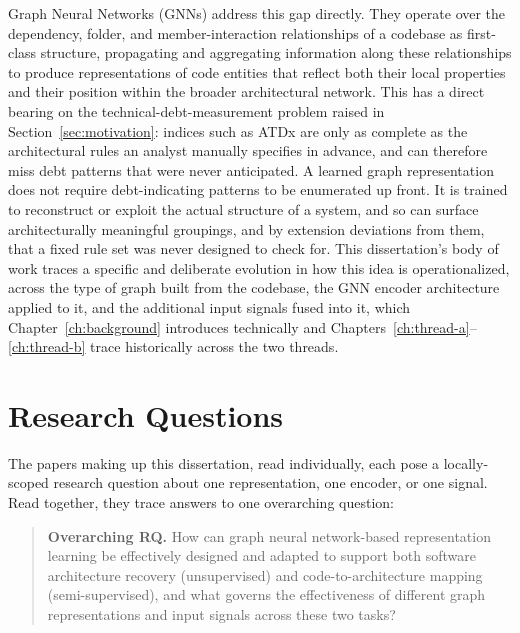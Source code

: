 Graph Neural Networks (GNNs) address this gap directly. They operate over the dependency, folder, and member-interaction relationships of a codebase as first-class structure, propagating and aggregating information along these relationships to produce representations of code entities that reflect both their local properties and their position within the broader architectural network. This has a direct bearing on the technical-debt-measurement problem raised in Section~\ref{sec:motivation}: indices such as ATDx are only as complete as the architectural rules an analyst manually specifies in advance, and can therefore miss debt patterns that were never anticipated. A learned graph representation does not require debt-indicating patterns to be enumerated up front. It is trained to reconstruct or exploit the actual structure of a system, and so can surface architecturally meaningful groupings, and by extension deviations from them, that a fixed rule set was never designed to check for. This dissertation's body of work traces a specific and deliberate evolution in how this idea is operationalized, across the type of graph built from the codebase, the GNN encoder architecture applied to it, and the additional input signals fused into it, which Chapter~\ref{ch:background} introduces technically and Chapters~\ref{ch:thread-a}--\ref{ch:thread-b} trace historically across the two threads.

\section{Research Questions}
\label{sec:research-questions}

The papers making up this dissertation, read individually, each pose a locally-scoped research question about one representation, one encoder, or one signal. Read together, they trace answers to one overarching question:

\begin{quote}
\textbf{Overarching RQ.} How can graph neural network-based representation learning be effectively designed and adapted to support both software architecture recovery (unsupervised) and code-to-architecture mapping (semi-supervised), and what governs the effectiveness of different graph representations and input signals across these two tasks?
\end{quote}

